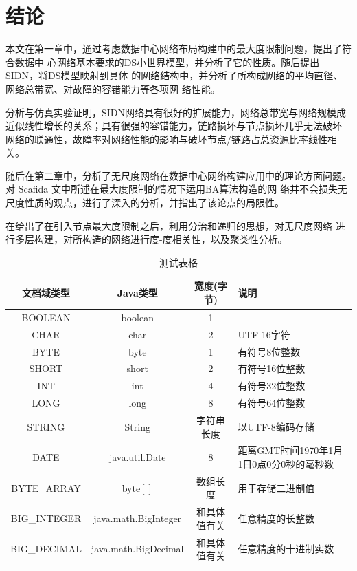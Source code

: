 \documentclass[oneside, phd]{njuthesis}
\begin{document}
\chapter{结论}\label{chapter_concludes}

本文在第一章中，通过考虑数据中心网络布局构建中的最大度限制问题，提出了符合数据中
心网络基本要求的DS小世界模型，并分析了它的性质。随后提出SIDN，将DS模型映射到具体
的网络结构中，并分析了所构成网络的平均直径、网络总带宽、对故障的容错能力等各项网
络性能。

分析与仿真实验证明，SIDN网络具有很好的扩展能力，网络总带宽与网络规模成
近似线性增长的关系；具有很强的容错能力，链路损坏与节点损坏几乎无法破坏
网络的联通性，故障率对网络性能的影响与破坏节点/链路占总资源比率线性相关。

随后在第二章中，分析了无尺度网络在数据中心网络构建应用中的理论方面问题。对
Scafida \cite{gyarmati2010scafida}文中所述在最大度限制的情况下运用BA算法构造的网
络并不会损失无尺度性质的观点，进行了深入的分析，并指出了该论点的局限性。

在给出了在引入节点最大度限制之后，利用分治和递归的思想，对无尺度网络
进行多层构建，对所构造的网络进行度-度相关性，以及聚类性分析。

\begin{table}
  \centering
  \begin{tabular}{cccp{38mm}}
    \toprule
    \textbf{文档域类型} & \textbf{Java类型} & \textbf{宽度(字节)} & \textbf{说明} \\
    \midrule
    BOOLEAN  & boolean &  1  & \\
    CHAR     & char    &  2  & UTF-16字符 \\
    BYTE     & byte    &  1  & 有符号8位整数 \\
    SHORT    & short   &  2  & 有符号16位整数 \\
    INT      & int     &  4  & 有符号32位整数 \\
    LONG     & long    &  8  & 有符号64位整数 \\
    STRING   & String  &  字符串长度  & 以UTF-8编码存储 \\
    DATE     & java.util.Date & 8 & 距离GMT时间1970年1月1日0点0分0秒的毫秒数 \\
    BYTE\_ARRAY & byte$[]$ & 数组长度 & 用于存储二进制值 \\
    BIG\_INTEGER & java.math.BigInteger & 和具体值有关 & 任意精度的长整数 \\
    BIG\_DECIMAL & java.math.BigDecimal & 和具体值有关 & 任意精度的十进制实数 \\
    \bottomrule
  \end{tabular}
  \caption{测试表格}\label{table:test5}
\end{table}
\end{document}
